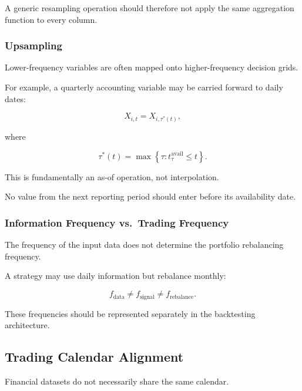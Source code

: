\documentclass[11pt,a4paper]{article}
\begin{document}
A generic resampling operation should therefore not apply the same aggregation
function to every column.


\subsubsection{Upsampling}

Lower-frequency variables are often mapped onto higher-frequency decision
grids.

For example, a quarterly accounting variable may be carried forward to daily
dates:

\begin{equation}
X_{i,t}
=
X_{i,\tau^*(t)},
\end{equation}

where

\begin{equation}
\tau^*(t)
=
\max
\left\{
\tau:
t_{\tau}^{\mathrm{avail}}
\leq t
\right\}.
\end{equation}

This is fundamentally an as-of operation, not interpolation.

No value from the next reporting period should enter before its availability
date.


\subsubsection{Information Frequency vs.\ Trading Frequency}

The frequency of the input data does not determine the portfolio rebalancing
frequency.

A strategy may use daily information but rebalance monthly:

\begin{equation}
\boxed{
f_{\mathrm{data}}
\neq
f_{\mathrm{signal}}
\neq
f_{\mathrm{rebalance}}.
}
\end{equation}

These frequencies should be represented separately in the backtesting
architecture.


\subsection{Trading Calendar Alignment}
\label{subsec:trading_calendar_alignment}

Financial datasets do not necessarily share the same calendar.
\end{document}
